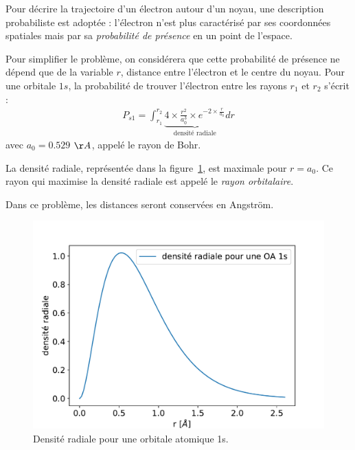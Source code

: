 \documentclass[%
oneside,                 %
final,                   %
10pt,french]{article}
\newenvironment{noticeshaded}
{\def\FrameCommand{\fboxsep=3mm\colorbox{grayicon_notice_background}}
 \MakeFramed {\advance\hsize-\width \FrameRestore}}{\endMakeFramed}
\newenvironment{notice_grayiconadmon}[1][À noter]{
\begin{noticeshaded}
\noindent
\begin{figure}
\vspace{-13pt}
\texttt{[image: latex\_figs/small\_gray\_notice]}
\end{figure} \textbf{#1}\par
\nobreak\noindent\ignorespaces
}
{
\end{noticeshaded}
}
\newenvironment{doconceexercise}{}{}
\newcounter{doconceexercisecounter}
\begin{document}
\begin{doconceexercise}



Pour décrire la trajectoire d'un électron autour d'un noyau, une description probabiliste est adoptée : l'électron n'est plus caractérisé par ses coordonnées spatiales mais par sa \emph{probabilité de présence} en un point de l'espace.

Pour simplifier le problème, on considérera que cette probabilité de présence ne dépend que de la variable $r$, distance entre l'électron et le centre du noyau. Pour une orbitale $1s$, la probabilité de trouver l'électron entre les rayons $r_1$ et $r_2$ s'écrit :
\begin{align*}
P_{s1} = \int_{r_1}^{r_2} \underbrace{4 \times \frac{r^2}{a_0^3} \times e^{-2 \times \frac{r}{a_0}}}_\text{densité radiale} dr
\end{align*}
avec $a_0 = 0.529$ $\AA$, appelé le rayon de Bohr.

La densité radiale, représentée dans la figure~\ref{fig:D_rad}, est maximale pour $r = a_0$. Ce rayon qui maximise la densité radiale est appelé le \emph{rayon orbitalaire}.

\begin{notice_grayiconadmon}[À noter]
Dans ce problème, les distances seront conservées en Angström.
\end{notice_grayiconadmon} %




\begin{figure}[!ht]  %
  \centerline{\includegraphics[width=0.7\linewidth]{imgs/densite_radiale.pdf}}
  \caption{
  Densité radiale pour une orbitale atomique 1s. \label{fig:D_rad}
  }
\end{figure}




\end{doconceexercise}
\end{document}
